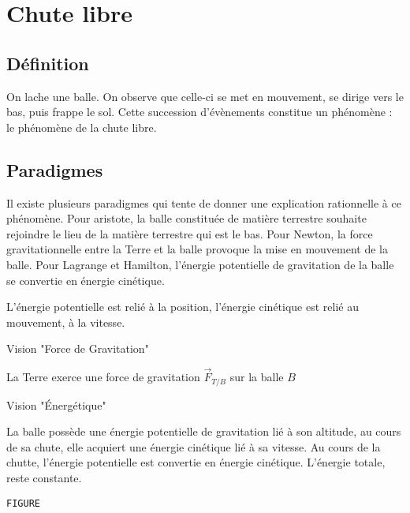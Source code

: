 
\section{Chute libre}
%
\subsection{Définition}

On lache une balle. On observe que celle-ci se met en mouvement, se dirige vers le bas, puis frappe le sol. Cette succession d'évènements constitue un phénomène : le phénomène de la chute libre.
\begin{center}

\end{center}

\subsection{Paradigmes}

Il existe plusieurs paradigmes qui tente de donner une explication rationnelle à ce phénomène. Pour aristote, la balle constituée de matière terrestre souhaite rejoindre le lieu de la matière terrestre qui est le bas. Pour Newton, la force gravitationnelle entre la Terre et la balle provoque la mise en mouvement de la balle. Pour Lagrange et Hamilton, l'énergie potentielle de gravitation de la balle se convertie en énergie cinétique. 


L'énergie potentielle est relié à la position, l'énergie cinétique est relié au mouvement, à la vitesse.

\begin{center}
Vision "Force de Gravitation"
\end{center}
La Terre exerce une force de gravitation $\overrightarrow{F}_{T/B}$ sur la balle $B$
\begin{center}

\end{center}
\begin{center}
Vision "Énergétique"
\end{center}
La balle possède une énergie potentielle de gravitation lié à son altitude, au cours de sa chute, elle acquiert une énergie cinétique lié à sa vitesse. Au cours de la chutte, l'énergie potentielle est convertie en énergie cinétique. L'énergie totale, reste constante.
\begin{center}
%
\texttt{FIGURE}
\end{center}


